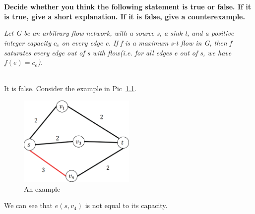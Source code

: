 
\chapter{}
\textbf{
Decide whether you think the following statement is true or false. If it is true, give a short explanation. If it is false, give a counterexample.
}

\emph{Let G be an arbitrary flow network, with a source s, a sink t, and a positive integer capacity $c_e$ on every edge e. If f is a maximum s-t flow in G, then f saturates every edge out of s with flow(i.e. for all edges e out of s, we have $f(e)=c_e$).}

\hspace*{\fill} \\

It is false. Consider the example in Pic~\ref{pic_4}.
\begin{figure}[!htbp]
\centering
\includegraphics[width=0.5\textwidth]{figures/1.eps}
\caption{An example}\label{pic_4}
\end{figure}
We can see that $e(s,v_4)$ is not equal to its capacity.